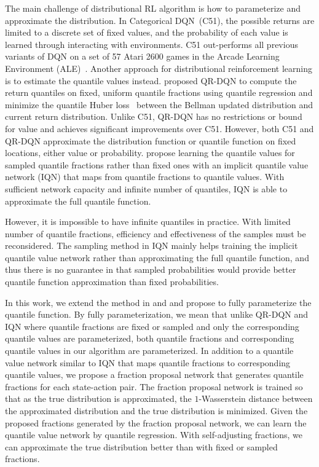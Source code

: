 \documentclass{article}
\begin{document}
The main challenge of distributional RL algorithm is how to parameterize and approximate the distribution. In Categorical DQN~\citep{bellemare2017distributional}(C51), the possible returns are limited to a discrete set of fixed values, and the probability of each value is learned through interacting with environments. C51 out-performs all previous variants of DQN on a set of 57 Atari 2600 games in the Arcade Learning Environment (ALE)~\citep{bellemare2013arcade}.
Another approach for distributional reinforcement learning is to estimate the quantile values instead. 
\cite{dabney2018distributional} proposed QR-DQN to compute the return quantiles on fixed, uniform quantile fractions using quantile regression and minimize the quantile Huber loss~\citep{huber:1964} between the Bellman updated distribution and current return distribution. Unlike C51, QR-DQN has no restrictions or bound for value and achieves significant improvements over C51. However, both C51 and QR-DQN approximate the distribution function or quantile function on fixed locations, either value or probability. \cite{dabney2018implicit} propose learning the quantile values for sampled quantile fractions rather than fixed ones with an implicit quantile value network (IQN) that maps from quantile fractions to quantile values. With sufficient network capacity and infinite number of quantiles, IQN is able to approximate the full quantile function.

However, it is impossible to have infinite quantiles in practice. With limited number of quantile fractions, efficiency and effectiveness of the samples must be reconsidered. The sampling method in IQN mainly helps training the implicit quantile value network rather than approximating the full quantile function, and thus there is no guarantee in that sampled probabilities would provide better quantile function approximation than fixed probabilities. 

In this work, we extend the method in \cite{dabney2018distributional} and \cite{dabney2018implicit} and propose to fully parameterize the quantile function. By fully parameterization, we mean that unlike QR-DQN and IQN where quantile fractions are fixed or sampled and only the corresponding quantile values are parameterized, both quantile fractions and corresponding quantile values in our algorithm are parameterized. In addition to a quantile value network similar to IQN that maps quantile fractions to corresponding quantile values, we propose a fraction proposal network that generates quantile fractions for each state-action pair. The fraction proposal network is trained so that as the true distribution is approximated, the $1$-Wasserstein distance between the approximated distribution and the true distribution is minimized. Given the proposed fractions generated by the fraction proposal network, we can learn the quantile value network by quantile regression. With self-adjusting fractions, we can approximate the true distribution better than with fixed or sampled fractions.
\end{document}
